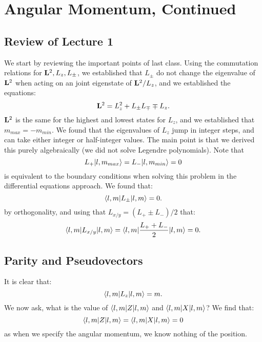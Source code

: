\section{Angular Momentum, Continued}
\subsection{Review of Lecture 1}
We start by reviewing the important points of last class. Using the commutation relations for $\mathbf{L}^2, L_z, L_\pm$, we established that $L_\pm$ do not change the eigenvalue of $\mathbf{L}^2$ when acting on an joint eigenstate of $\mathbf{L}^2/L_z$, and we established the equations:
\begin{equation}
    \mathbf{L}^2 = L_z^2 + L_{\pm}L_{\mp} \mp L_z.
\end{equation}
$\mathbf{L}^2$ is the same for the highest and lowest states for $L_z$, and we established that $m_{max} = -m_{min}$. We found that the eigenvalues of $L_z$ jump in integer steps, and can take either integer or half-integer values. The main point is that we derived this purely algebraically (we did not solve Legendre polynomials). Note that 
\begin{equation}
    L_+\lvert l, m_{max} \rangle = L_-\lvert l, m_{min} \rangle = 0
\end{equation}
is equivalent to the boundary conditions when solving this problem in the differential equations approach. We found that:
\begin{equation}
    \langle l, m \rvert L_{\pm} \lvert l, m \rangle = 0.
\end{equation}
by orthogonality, and using that $L_{x/y} = (L_+ \pm L_-)/2$ that:
\begin{equation}
    \langle l, m \rvert L_{x/y}\lvert l, m \rangle = \langle l, m \rvert\frac{L_+ + L_-}{2}\lvert l, m \rangle = 0.
\end{equation}


\subsection{Parity and Pseudovectors}
It is clear that:
\begin{equation}
    \langle l, m \rvert L_z\lvert l, m \rangle = m.
\end{equation}
We now ask, what is the value of $\langle l, m \rvert Z\lvert l, m \rangle$ and $\langle l, m \rvert X\lvert l, m \rangle$? We find that:
\begin{equation}
    \langle l, m \rvert Z\lvert l, m \rangle = \langle l, m \rvert X\lvert l, m \rangle = 0
\end{equation}
as when we specify the angular momentum, we know nothing of the position.


